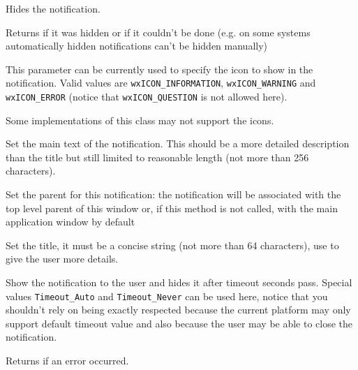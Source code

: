 \label{wxnotificationmessageclose}


Hides the notification.

Returns \true if it was hidden or \false if it couldn't be done (e.g. on some
systems automatically hidden notifications can't be hidden manually)


\label{wxnotificationmessagesetflags}


This parameter can be currently used to specify the icon to show in the
notification. Valid values are \texttt{wxICON\_INFORMATION}, 
\texttt{wxICON\_WARNING} and \texttt{wxICON\_ERROR} (notice that 
\texttt{wxICON\_QUESTION} is not allowed here).

Some implementations of this class may not support the icons.


\label{wxnotificationmessagesetmessage}


Set the main text of the notification. This should be a more detailed
description than the title but still limited to reasonable length (not more
than 256 characters).


\label{wxnotificationmessagesetparent}


Set the parent for this notification: the notification will be associated with
the top level parent of this window or, if this method is not called, with the
main application window by default


\label{wxnotificationmessagesettitle}


Set the title, it must be a concise string (not more than 64 characters), use 
 to give the user more
details.


\label{wxnotificationmessageshow}


Show the notification to the user and hides it after timeout seconds
pass. Special values \texttt{Timeout\_Auto} and \texttt{Timeout\_Never} can be
used here, notice that you shouldn't rely on  being exactly
respected because the current platform may only support default timeout value
and also because the user may be able to close the notification.

Returns \false if an error occurred.

